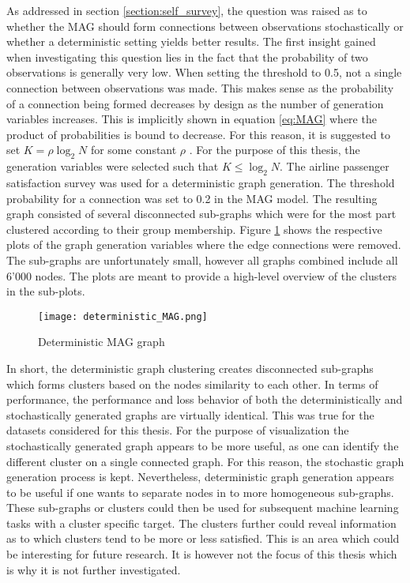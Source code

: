   As addressed in section \ref{section:self_survey}, the question was raised 
  as to whether the MAG should form connections between observations
  stochastically or whether a deterministic setting yields better results. The 
  first insight gained when investigating this question lies in the fact that 
  the probability of two observations is generally very low. When setting the 
  threshold to 0.5, not a single connection between observations was made. This
  makes sense as the probability of a connection being formed decreases by
  design as the number of generation variables increases. This is implicitly
  shown in equation \ref{eq:MAG} where the product of probabilities is bound to
  decrease. For this reason, it is suggested to set $K=\rho\log_{2}N$
  for some constant $\rho$ \citep[p. 122]{kim2012multiplicative}. For the
  purpose of this thesis, the generation variables were selected such that
  $K\leqslant\log_{2} N$. The airline passenger satisfaction survey was used
  for a deterministic graph generation. The threshold probability for a
  connection was set to 0.2 in the MAG model. The resulting graph consisted of
  several disconnected sub-graphs which were for the most part clustered
  according to their group membership. Figure \ref{fig:det_MAG} shows the
  respective plots of the graph generation variables where the edge connections
  were removed. The sub-graphs are unfortunately small, however all graphs
  combined include all 6'000 nodes. The plots are meant to provide a high-level
  overview of the clusters in the sub-plots. 

  \begin{figure}[h]
		\centering
		\texttt{[image: deterministic\_MAG.png]}
		\caption{Deterministic MAG graph}
        \label{fig:det_MAG}
  \end{figure}

  \noindent In short, the deterministic graph clustering creates disconnected 
  sub-graphs which forms clusters based on the nodes similarity to each other.
  In terms of performance, the performance and loss behavior of both the
  deterministically and stochastically generated graphs are virtually
  identical. This was true for the datasets considered for this thesis. For the 
  purpose of visualization the stochastically generated graph appears
  to be more useful, as one can identify the different cluster on a single
  connected graph.  For this reason, the stochastic graph generation process is 
  kept. Nevertheless, deterministic graph generation appears to be useful if 
  one wants to separate nodes in to more homogeneous sub-graphs. These 
  sub-graphs or clusters could then be used for subsequent machine learning 
  tasks with a cluster specific target. The clusters further could reveal 
  information as to which clusters tend to be more or less satisfied. This is 
  an area which could be interesting for future research. It is however not 
  the focus of this thesis which is why it is not further investigated. 
  
